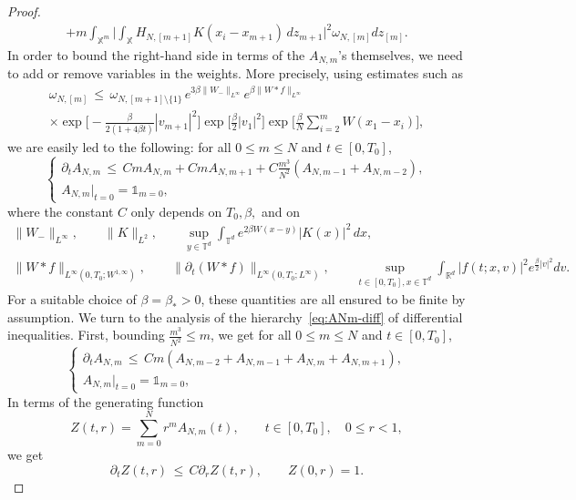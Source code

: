 \documentclass[a4paper,11pt,reqno,noindent]{amsart}
\theoremstyle{plain}
\theoremstyle{definition}
\numberwithin{equation}{section}
\newcommand{\Xd}{\mathbb X}
\newcommand{\R}{\mathbb R}
\newcommand{\T}{\mathbb T}
\begin{document}
\begin{proof}
\begin{multline*}
+m\int_{\Xd^{m}}\Big|\int_\Xd H_{N,[m+1]}K(x_i-x_{m+1})\,dz_{m+1}\Big|^2\omega_{N,[m]}dz_{[m]}.
\end{multline*}
In order to bound the right-hand side in terms of the $A_{N,m}$'s themselves, we need to add or remove variables in the weights. More precisely, using estimates such as
\begin{multline*}
\omega_{N,[m]}
\,\le\, \omega_{N,[m+1]\setminus\{1\}}\,e^{3\beta\|W_-\|_{L^\infty}}e^{\beta\|W\ast f\|_{L^\infty}}\\[-2mm]
\times\exp\Big[-\frac{\beta}{2(1+4\beta t)}|v_{m+1}|^2\Big]
\exp\Big[\frac\beta2|v_1|^2\Big]\exp\Big[\frac\beta{N}\sum_{i=2}^mW(x_1-x_i)\Big],
\end{multline*}
we are easily led to the following: for all $0\le m\le N$ and $t\in[0,T_0]$,
\begin{equation}\label{eq:ANm-diff}
\left\{\begin{array}{l}
\partial_tA_{N,m}\,\le\,
CmA_{N,m}
+CmA_{N,m+1}
+C\frac{m^3}{N^2}(A_{N,m-1}+A_{N,m-2}),\\
A_{N,m}|_{t=0}=\mathds1_{m=0},
\end{array}\right.
\end{equation}
where the constant $C$ only depends on $T_0,\beta,$ and on
\begin{gather*}
\|W_-\|_{L^\infty},\qquad\|K\|_{L^2},\qquad\sup_{y\in\T^d}\int_{\T^d} e^{2\beta W(x-y)}|K(x)|^2\,dx,\\[-2mm]
\|W\ast f\|_{L^\infty(0,T_0;W^{1,\infty})},\qquad \|\partial_t(W\ast f)\|_{L^{\infty}(0,T_0;L^{\infty})},\qquad\sup_{t\in[0,T_0],x\in\T^d}\int_{\R^d}|f(t;x,v)|^2e^{\frac\beta2|v|^2}dv.
\end{gather*}
For a suitable choice of $\beta=\beta_*>0$, these quantities are all ensured to be finite by assumption.
We turn to the analysis of the hierarchy~\eqref{eq:ANm-diff} of differential inequalities. First, bounding $\frac{m^3}{N^2}\le m$, we get for all $0\le m\le N$ and $t\in[0,T_0]$,
\begin{equation*}
\left\{\begin{array}{l}
\partial_tA_{N,m}\,\le\,
Cm(A_{N,m-2}+A_{N,m-1}+A_{N,m}+A_{N,m+1}),\\
A_{N,m}|_{t=0}=\mathds1_{m=0},
\end{array}\right.
\end{equation*}
In terms of the generating function
\[Z(t,r)=\sum_{m=0}^Nr^mA_{N,m}(t),\qquad t\in[0,T_0],\quad 0\le r<1,\]
we get
\begin{equation*}
\partial_tZ(t,r)
\,\le\, C\partial_rZ(t,r),\qquad Z(0,r)=1.

\end{equation*}
\end{proof}
\end{document}
